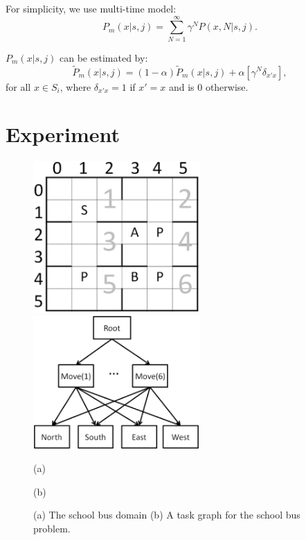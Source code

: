 \documentclass{article} %
\begin{document}
For simplicity, we use multi-time model\cite{SMDP}: 
\begin{equation}
    P_m(x|s, j) = \sum^{\infty}_{N=1} \gamma^N P(x, N|s, j).
    \label{eq:multiProb}
\end{equation}

$P_m(x|s, j)$ can be estimated by:
\begin{equation}
    \tilde{P}_m(x|s, j) = (1-\alpha)\tilde{P}_m(x|s, j) + \alpha [ \gamma^N \delta_{x'x}],
    \label{eq:approxP}
\end{equation}
for all $x \in S_i$, where $\delta_{x'x}=1$ if $x' = x$ and is 0 otherwise.


\section{Experiment}

\begin{figure}[t]
 \begin{minipage}[b]{0.5\linewidth}
    \includegraphics[width=2.5in] {BusSmall.eps}
\end{minipage}
\begin{minipage}[b]{0.5\linewidth}
    \includegraphics[width=2.5in] {BusHierarchy.eps}
\end{minipage}
\begin{minipage}[b]{0.5\linewidth} \centering (a) \end{minipage}
\begin{minipage}[b]{0.5\linewidth} \centering (b) \end{minipage}

\caption{(a) The school bus domain (b) A task graph for the school bus problem.}
\label{fig:bus}
\end{figure}
\end{document}
